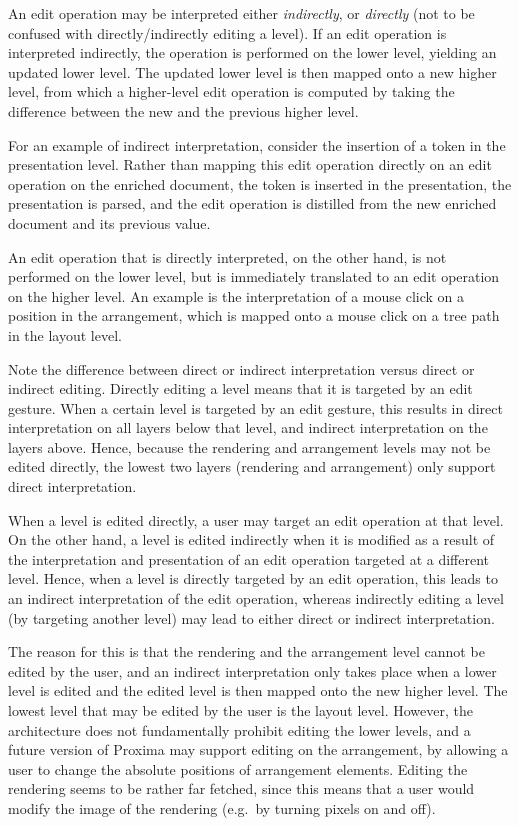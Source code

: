 An edit operation may be interpreted either {\em indirectly}, or {\em directly} (not to be confused with directly/indirectly editing a level). If an edit operation is interpreted indirectly, the operation is performed on the lower level, yielding an updated lower level. The updated lower level is then mapped onto a new higher level, from which a higher-level edit operation is computed by taking the difference between the new and the previous higher level.

For an example of indirect interpretation, consider the insertion of a token in the presentation level. 
Rather than mapping this edit operation directly on an edit operation on the enriched document, the token is inserted in the presentation, the presentation is parsed, and the edit operation is distilled from the new enriched document and its previous value.

An edit operation that is directly interpreted, on the other hand, is not performed on the lower level, but is immediately translated to an edit operation on the higher level. An example is the interpretation of a mouse click on a position in the arrangement, which is mapped onto a mouse click on a tree path in the layout level. 

Note the difference between direct or indirect interpretation versus direct or indirect editing. Directly editing a level means that it is targeted by an edit gesture. When a certain level is targeted by an edit gesture, this results in direct interpretation on all layers below that level, and indirect interpretation on the layers above. Hence, because the rendering and arrangement levels may not be edited directly, the lowest two layers (rendering and arrangement) only support direct interpretation.

\bc When a level is edited directly, a user may target an edit operation at that level. On the other hand, a level is edited indirectly when it is modified as a result of the interpretation and presentation of  an edit operation targeted at a different level. Hence, when a level is directly targeted by an edit operation, this leads to an indirect interpretation of the edit operation, whereas indirectly editing a level (by targeting another level) may lead to either direct or indirect interpretation. \ec



\bc The reason for this is that the rendering and the arrangement level cannot be edited by the user, and an indirect interpretation only takes place when a lower level is edited and the edited level is then mapped onto the new higher level. The lowest level that may be edited by the user is the layout level. However, the architecture does not fundamentally prohibit editing the lower levels, and a future version of Proxima may support editing on the arrangement, by allowing a user to change the absolute positions of arrangement elements. Editing the rendering seems to be rather far fetched, since this means that a user would modify the image of the rendering (e.g.\ by turning pixels on and off).
\ec



